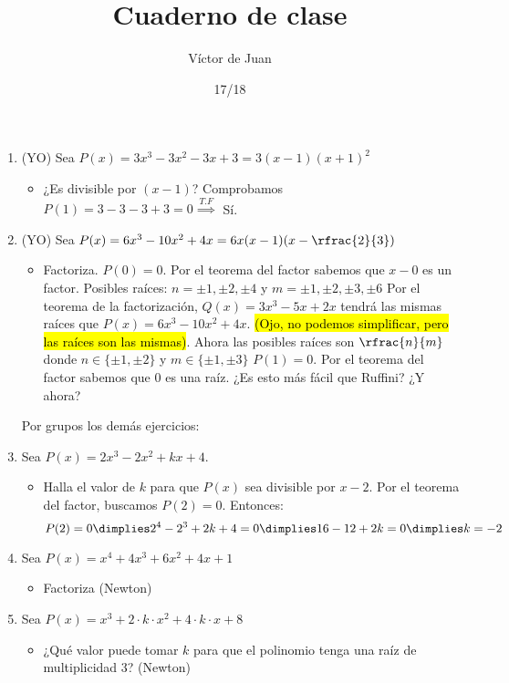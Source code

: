 \documentclass[palatino,nosec]{Docencia}
\title{Cuaderno de clase}
\author{Víctor de Juan}
\date{17/18}
\begin{document}
\begin{enumerate}
\item (YO) Sea $P(x) = 3x^3-3x^2-3x+3 = 3(x-1)(x+1)^2$
\begin{itemize}
	\item ¿Es divisible por $(x-1)$? Comprobamos $P(1) = 3-3-3+3 = 0 \overset{T.F}{\implies}$ Sí.
\end{itemize}

\item (YO) Sea $P(x) = 6x^3-10x^2+4x = 6x(x-1)(x-\rfrac{2}{3})$ 
\begin{itemize}
	\item Factoriza.
	\subitem $P(0) = 0$. Por el teorema del factor sabemos que $x-0$ es un factor.
	\subitem Posibles raíces: $n=\pm1,\pm2,\pm4$ y $m=\pm1,\pm2,\pm3,\pm6$	
	\subitem Por el teorema de la factorización, $Q(x) = 3x^3-5x+2x$ tendrá las mismas raíces que $P(x) = 6x^3-10x^2+4x$. \hl{(Ojo, no podemos simplificar, pero las raíces son las mismas)}. Ahora las posibles raíces son $\rfrac{n}{m}$ donde $n\in\{\pm1,\pm2\}$ y $m\in\{\pm1,\pm3\}$
	\subitem $P(1) = 0$. Por el teorema del factor sabemos que $0$ es una raíz. ¿Es esto más fácil que Ruffini? ¿Y ahora?
\end{itemize}

Por grupos los demás ejercicios:
\item Sea $P(x) = 2x^3-2x^2+kx+4$.
\begin{itemize}
	\item Halla el valor de $k$ para que $P(x)$ sea divisible por $x-2$.
	\subitem Por el teorema del factor, buscamos $P(2) = 0$. Entonces:
	\[
		P(2) = 0 \dimplies 2^4-2^3+2k+4 = 0 \dimplies 16-12+2k = 0 \dimplies k = -2
	\]
\end{itemize}


\item Sea $P(x) = x^4+4x^3+6x^2+4x+1$
\begin{itemize}
	\item Factoriza (Newton)
\end{itemize}

\item Sea $P(x) = x^3+2·k·x^2+4·k·x+8$
\begin{itemize}
	\item ¿Qué valor puede tomar $k$ para que el polinomio tenga una raíz de multiplicidad 3? (Newton)
\end{itemize}


\end{enumerate}
\end{document}
